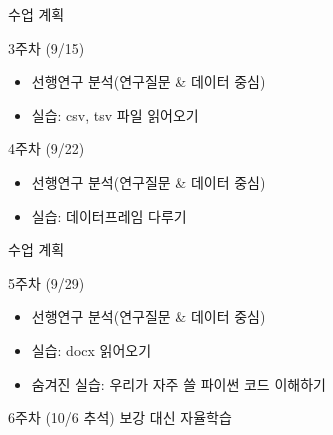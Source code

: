 \documentclass[11pt, aspectratio=169]{beamer}
\begin{document}
\begin{frame}[t]{수업 계획}
  \begin{block}{3주차 (9/15)}
    \begin{itemize}
      \item 선행연구 분석(연구질문 \& 데이터 중심)
      \item 실습: csv, tsv 파일 읽어오기
    \end{itemize}    
  \end{block}

  \begin{block}{4주차 (9/22)}
    \begin{itemize}
      \item 선행연구 분석(연구질문 \& 데이터 중심)
      \item 실습: 데이터프레임 다루기
    \end{itemize}    
  \end{block}
\end{frame}

\begin{frame}[t]{수업 계획}
  \begin{block}{5주차 (9/29)}
    \begin{itemize}
      \item 선행연구 분석(연구질문 \& 데이터 중심)
      \item 실습: docx 읽어오기
      \item 숨겨진 실습: 우리가 자주 쓸 파이썬 코드 이해하기
    \end{itemize}    
  \end{block}

  \begin{block}{6주차 (10/6 추석)}
    보강 대신 자율학습
  \end{block}
\end{frame}
\end{document}
